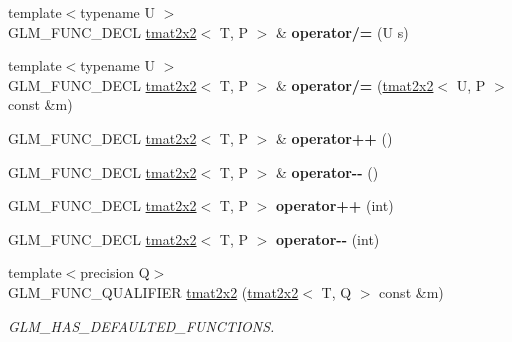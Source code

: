 \begin{DoxyCompactItemize}
\mbox{\label{structglm_1_1tmat2x2_a9004d0d6f8a7e19c0d592a0f1f9aed65}} 
{\footnotesize template$<$typename U $>$ }\\G\+L\+M\+\_\+\+F\+U\+N\+C\+\_\+\+D\+E\+CL \hyperlink{structglm_1_1tmat2x2}{tmat2x2}$<$ T, P $>$ \& {\bfseries operator/=} (U s)
\item 
\mbox{\label{structglm_1_1tmat2x2_a2aa165291397c48680be24491256870e}} 
{\footnotesize template$<$typename U $>$ }\\G\+L\+M\+\_\+\+F\+U\+N\+C\+\_\+\+D\+E\+CL \hyperlink{structglm_1_1tmat2x2}{tmat2x2}$<$ T, P $>$ \& {\bfseries operator/=} (\hyperlink{structglm_1_1tmat2x2}{tmat2x2}$<$ U, P $>$ const \&m)
\item 
\mbox{\label{structglm_1_1tmat2x2_a9b29f7cc4e8fb411fcb0a7f1c26f5cd2}} 
G\+L\+M\+\_\+\+F\+U\+N\+C\+\_\+\+D\+E\+CL \hyperlink{structglm_1_1tmat2x2}{tmat2x2}$<$ T, P $>$ \& {\bfseries operator++} ()
\item 
\mbox{\label{structglm_1_1tmat2x2_a3f180d690b3ebc06b9fc6ecc4cbd8349}} 
G\+L\+M\+\_\+\+F\+U\+N\+C\+\_\+\+D\+E\+CL \hyperlink{structglm_1_1tmat2x2}{tmat2x2}$<$ T, P $>$ \& {\bfseries operator-\/-\/} ()
\item 
\mbox{\label{structglm_1_1tmat2x2_a6fee5ef9bad6a0fd8edf45063557c188}} 
G\+L\+M\+\_\+\+F\+U\+N\+C\+\_\+\+D\+E\+CL \hyperlink{structglm_1_1tmat2x2}{tmat2x2}$<$ T, P $>$ {\bfseries operator++} (int)
\item 
\mbox{\label{structglm_1_1tmat2x2_aeddcbe861c53a7dc006001e816da82d6}} 
G\+L\+M\+\_\+\+F\+U\+N\+C\+\_\+\+D\+E\+CL \hyperlink{structglm_1_1tmat2x2}{tmat2x2}$<$ T, P $>$ {\bfseries operator-\/-\/} (int)
\item 
\mbox{\label{structglm_1_1tmat2x2_a183612b4e6b8300c93d45dc3c1bb6ff2}} 
{\footnotesize template$<$precision Q$>$ }\\G\+L\+M\+\_\+\+F\+U\+N\+C\+\_\+\+Q\+U\+A\+L\+I\+F\+I\+ER \hyperlink{structglm_1_1tmat2x2_a183612b4e6b8300c93d45dc3c1bb6ff2}{tmat2x2} (\hyperlink{structglm_1_1tmat2x2}{tmat2x2}$<$ T, Q $>$ const \&m)
\begin{DoxyCompactList}\small\item\em G\+L\+M\+\_\+\+H\+A\+S\+\_\+\+D\+E\+F\+A\+U\+L\+T\+E\+D\+\_\+\+F\+U\+N\+C\+T\+I\+O\+NS. \end{DoxyCompactList}\item 

\end{DoxyCompactItemize}
